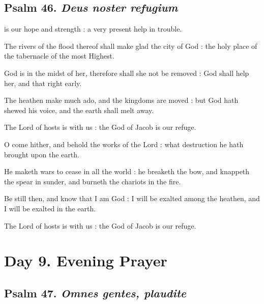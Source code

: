 \subsection{Psalm 46. \textit{Deus noster refugium}}

 is our hope and strength : a very present help in trouble.\par
{}
The rivers of the flood thereof shall make glad the city of God : the holy place of the tabernacle of the most Highest.\par
{}God is in the midst of her, therefore shall she not be removed : God shall help her, and that right early.\par
{}The heathen make much ado, and the kingdoms are moved : but God hath shewed his voice, and the earth shall melt away.\par
{}The Lord of hosts is with us : the God of Jacob is our refuge.\par
{}O come hither, and behold the works of the Lord : what destruction he hath brought upon the earth.\par
{}He maketh wars to cease in all the world : he breaketh the bow, and knappeth the spear in sunder, and burneth the chariots in the fire.\par
{}Be still then, and know that I am God : I will be exalted among the heathen, and I will be exalted in the earth.\par
{}The Lord of hosts is with us : the God of Jacob is our refuge.\par

\section*{Day 9. Evening Prayer}

\subsection{Psalm 47. \textit{Omnes gentes, plaudite}}

